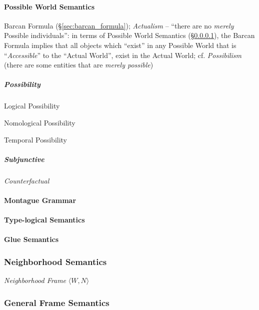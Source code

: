 \paragraph{Possible World Semantics}\label{sec:possible_world}\hfill

\fist Barcan Formula (\S\ref{sec:barcan_formula}); \emph{Actualism} -- ``there
are no \emph{merely} Possible individuals'': in terms of Possible World
Semantics (\S\ref{sec:possible_world}), the Barcan Formula implies that all
objects which ``exist'' in any Possible World that is ``\emph{Accessible}'' to
the ``Actual World'', exist in the Actual World; cf. \emph{Possibilism} (there
are some entities that are \emph{merely possible})



\subparagraph{Possibility}\label{sec:possibility}\hfill

Logical Possibility

Nomological Possibility

Temporal Possibility

\subparagraph{Subjunctive}\label{sec:subjunctive}\hfill

\emph{Counterfactual}



\paragraph{Montague Grammar}\label{sec:montague_grammar}\hfill

\paragraph{Type-logical Semantics}\label{sec:typelogical_semantics}\hfill

\paragraph{Glue Semantics}\label{sec:glue_semantics}\hfill



\subsubsection{Neighborhood Semantics}
\label{sec:neighborhood_semantics}

\emph{Neighborhood Frame} $\langle W, N \rangle$



\subsubsection{General Frame Semantics}
\label{sec:general_frame_semantics}

